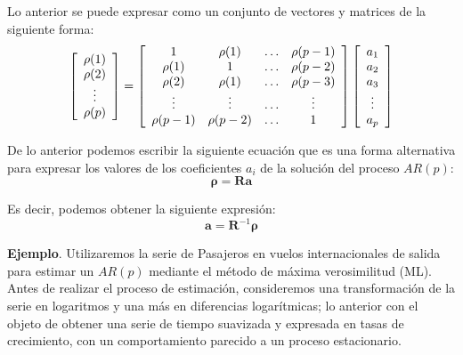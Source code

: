\documentclass[
]{book}
\begin{document}
Lo anterior se puede expresar como un conjunto de vectores y matrices de la siguiente forma:
\begin{equation}
    \left[ 
    \begin{array}{c}
        \rho(1) \\
        \rho(2) \\
        \vdots \\
        \rho(p)
    \end{array} 
    \right]
    = 
    \left[ 
    \begin{array}{c c c c}
        1 & \rho(1) & \ldots & \rho(p - 1) \\
        \rho(1) & 1 & \ldots & \rho(p - 2) \\
        \rho(2) & \rho(1) & \ldots & \rho(p - 3) \\
        \vdots & \vdots & \ldots & \vdots \\
        \rho(p - 1) & \rho(p - 2) & \ldots & 1 \\
    \end{array} 
    \right]
    \left[ 
    \begin{array}{c}
        a_1 \\
        a_2 \\
        a_3 \\
        \vdots \\
        a_p \\
    \end{array} 
    \right]
\end{equation}

De lo anterior podemos escribir la siguiente ecuación que es una forma alternativa para expresar los valores de los coeficientes \(a_i\) de la solución del proceso \(AR(p)\):
\begin{equation}
    \boldsymbol{\rho} = \mathbf{R} \mathbf{a}
\end{equation}

Es decir, podemos obtener la siguiente expresión:
\begin{equation}
    \mathbf{a} = \mathbf{R}^{-1} \boldsymbol{\rho}
\end{equation}

\textbf{Ejemplo}. Utilizaremos la serie de Pasajeros en vuelos internacionales de salida para estimar un \(AR(p)\) mediante el método de máxima verosimilitud (ML). Antes de realizar el proceso de estimación, consideremos una transformación de la serie en logaritmos y una más en diferencias logarítmicas; lo anterior con el objeto de obtener una serie de tiempo suavizada y expresada en tasas de crecimiento, con un comportamiento parecido a un proceso estacionario.
\end{document}
